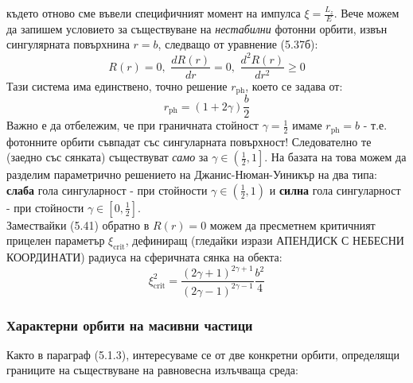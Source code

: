 където отново сме въвели специфичният момент на импулса $\xi = \frac{L_z}{E}$. Вече можем да запишем условието за съществуване на \emph{нестабилни} фотонни орбити, извън сингулярната повърхнина $r = b$, следващо от уравнение (5.37б):
	\begin{equation}
	R(r) = 0,\,\, \frac{dR(r)}{dr} = 0,\,\, \frac{d^2R(r)}{dr^2} \ge 0
\end{equation}
Тази система има единствено, точно решение $r_\text{ph}$, което се задава от:
\begin{equation}
	r_{\text{ph}} = (1 + 2\gamma)\frac{b}{2}
\end{equation}
Важно е да отбележим, че при граничната стойност $\gamma = \frac{1}{2}$ имаме $r_{\text{ph}} = b$ - т.е. фотонните орбити съвпадат със сингуларната повърхност! Следователно те (заедно със сянката) съществуват \emph{само} за $\gamma \in \left(\frac{1}{2}, 1\right]$. На базата на това можем да разделим параметрично решението на Джанис-Нюман-Уиникър на два типа: \textbf{слаба} гола сингуларност - при стойности $\gamma \in \left(\frac{1}{2},1\right)$ и \textbf{силна} гола сингуларност - при стойности $\gamma \in \left[0,\frac{1}{2}\right]$.\\\newline
Замествайки (5.41) обратно в $R(r) = 0$ можем да пресметнем критичният прицелен параметър $\xi_\text{crit}$, дефиниращ (гледайки изрази АПЕНДИСК С НЕБЕСНИ КООРДИНАТИ) радиуса на сферичната сянка на обекта:
\begin{equation}
	\xi_\text{crit}^2 = \frac{(2\gamma + 1)^{2\gamma + 1}}{(2\gamma - 1)^{2\gamma - 1}}\frac{b^2}{4}
\end{equation}
\subsubsection{Характерни орбити на масивни частици}

Както в параграф (5.1.3), интересуваме се от две конкретни орбити, определящи границите на съществуване на равновесна излъчваща среда:\\

